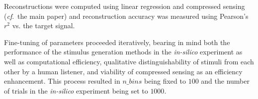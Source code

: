 \documentclass[journal]{IEEEtran}
\newcommand{\cf}{\textit{cf}.\ }
\begin{document}
Reconstructions were computed using linear regression and compressed sensing
(\cf the main paper)
and reconstruction accuracy was measured using Pearson's $r^2$ vs. the target signal.

Fine-tuning of parameters proceeded iteratively,
bearing in mind both the performance of the stimulus generation methods
in the \textit{in-silico} experiment as well as computational efficiency,
qualitative distinguishability of stimuli from each other by a human listener,
and viability of compressed sensing as an efficiency enhancement.
This process resulted in $n \_ bins$ being fixed to $100$ and
the number of trials in the \textit{in-silico} experiment being set to $1000$.

\begin{table}[ht]
	\begin{center}	
		\small
	\end{center}
	\caption{Top-5 stimulus generation methods by $r^2$ score averaged over
  buzzing, electric, roaring, screeching, and static tinnitus examples,
  with $n \_ bins = 100$ and $n \_ trials = 1000$.
  }
	\label{tbl:hparam_results}
\end{table}


\end{document}

